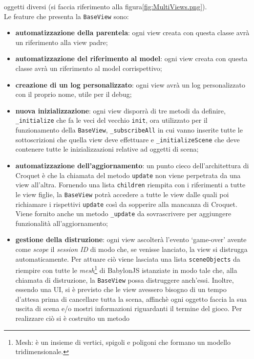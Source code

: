 oggetti diversi (si faccia riferimento alla figura\ref{fig:MultiViews.png}).\\
Le feature che presenta la \texttt{BaseView} sono:
\begin{itemize}
    \item \textbf{automatizzazione della parentela}: ogni view creata con questa classe avrà un riferimento alla view padre;
    \item \textbf{automatizzazione del riferimento al model}: ogni view creata con questa classe avrà un riferimento al model corrispettivo;
    \item \textbf{creazione di un log personalizzato}: ogni view avrà un log personalizzato con il proprio nome, utile per il debug;
    \item \textbf{nuova inizializzazione}: ogni view disporrà di tre metodi da definire, \texttt{\_initialize} che fa le veci del vecchio \texttt{init}, ora utilizzato per il funzionamento
    della \texttt{BaseView}, \texttt{\_subscribeAll} in cui vanno inserite tutte le sottoscrizioni che quella view deve effettuare e \texttt{\_initializeScene} che deve contenere tutte le
    inizializzazioni relative ad oggetti di scena;
    \item \textbf{automatizzazione dell'aggiornamento}: un punto cieco dell'architettura di Croquet è che la chiamata del metodo \texttt{update} non viene perpetrata da una view all'altra.
    Fornendo una lista \texttt{children} riempita con i riferimenti a tutte le view figlie, la \texttt{BaseView} potrà accedere a tutte le view dalle quali poi richiamare i rispettivi
    \texttt{update} così da sopperire alla mancanza di Croquet. Viene fornito anche un metodo \texttt{\_update} da sovrascrivere per aggiungere funzionalità all'aggiornamento;
    \item \textbf{gestione della distruzione}: ogni view ascolterà l'evento `game-over' avente come \textit{scope} il \textit{session ID} di modo che, se venisse lanciato, la view
    si distrugga automaticamente. Per attuare ciò viene lasciata una lista \texttt{sceneObjects} da riempire con tutte le \textit{mesh}\footnote{Mesh: è un insieme di vertici, spigoli e 
    poligoni che formano un modello tridimensionale.} di BabylonJS istanziate in modo tale che,
    alla chiamata di distruzione, la \texttt{BaseView} possa distruggere anch'essi. Inoltre, essendo una UI, si è previsto che le view avessero bisogno di un tempo d'attesa prima di 
    cancellare tutta la scena, affinchè ogni oggetto faccia la sua uscita di scena e/o mostri informazioni riguardanti il termine del gioco. Per realizzare ciò si è costruito un metodo 

\end{itemize}
